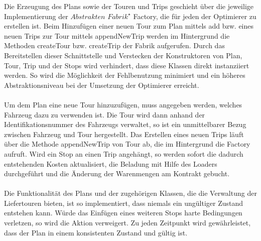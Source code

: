 \vspace*{-1em}
\noindent
Die Erzeugung des Plans sowie der Touren und Trips geschieht über die jeweilige Implementierung der $Abstrakten$ $Fabrik^\star$ \textsf{Factory}, die für jeden der Optimierer zu erstellen ist. Beim Hinzufügen einer neuen Tour zum Plan mittels \textsf{add} bzw. eines neuen Trips zur Tour mittels \textsf{appendNewTrip} werden im Hintergrund die Methoden \textsf{createTour} bzw. \textsf{createTrip} der Fabrik aufgerufen. Durch das Bereitstellen dieser Schnittstelle und Verstecken der Konstruktoren von \textsf{Plan}, \textsf{Tour}, \textsf{Trip} und der \textsf{Stop}s wird verhindert, dass diese Klassen direkt instanziiert werden. So wird die Möglichkeit der Fehlbenutzung minimiert und ein höheres Abstraktionsniveau bei der Umsetzung der Optimierer erreicht. \\
\\
Um dem Plan eine neue Tour hinzuzufügen, muss angegeben werden, welches Fahrzeug dazu zu verwenden ist. Die Tour wird dann anhand der Identifikationsnummer des Fahrzeugs verwaltet, so ist ein unmittelbarer Bezug zwischen Fahrzeug und Tour hergestellt. Das Erstellen eines neuen Trips läuft über die Methode \textsf{appendNewTrip} von Tour ab, die im Hintergrund die Factory aufruft. Wird ein Stop an einen Trip angehängt, so werden sofort die dadurch entstehenden Kosten aktualisiert, die Beladung mit Hilfe des Loaders durchgeführt und die Änderung der Warenmengen am Kontrakt gebucht. \\
\\
Die Funktionalität des Plans und der zugehörigen Klassen, die die Verwaltung der Liefertouren bieten, ist so implementiert, dass niemals ein ungültiger Zustand entstehen kann. Würde das Einfügen eines weiteren Stops harte Bedingungen verletzen, so wird die Aktion verweigert. Zu jeden Zeitpunkt wird gewährleistet, dass der Plan in einem konsistenten Zustand und gültig ist.

